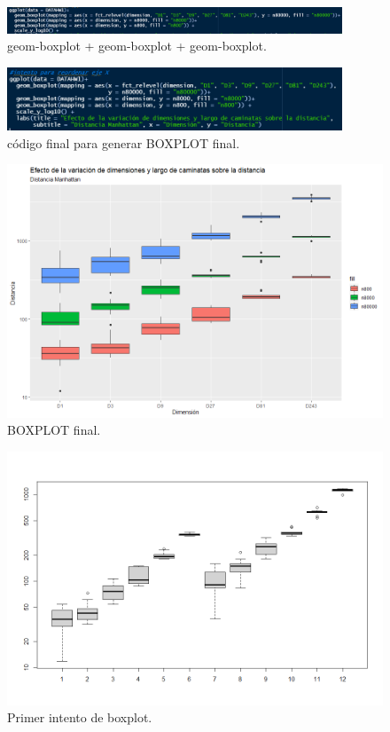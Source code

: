 \documentclass{article}
\begin{document}
\begin{figure} %
    \centering
    \includegraphics[width=100mm]{figura 5.PNG} %
    \caption{geom-boxplot + geom-boxplot + geom-boxplot.}
    \label{figura 5}
\end{figure}

\begin{figure} %
    \centering
    \includegraphics[width=100mm]{figura 6.PNG} %
    \caption{c\'odigo final para generar BOXPLOT final.}
    \label{figura 6}
\end{figure}

\begin{figure} %
    \centering
    \includegraphics[width=160mm]{figura 7.PNG} %
    \caption{BOXPLOT final.}
    \label{figura 7}
\end{figure}

\begin{figure} %
    \centering
    \includegraphics[width=150mm]{figura 8.PNG} %
    \caption{Primer intento de boxplot.}
    \label{figura 8}
\end{figure}



\end{document}
